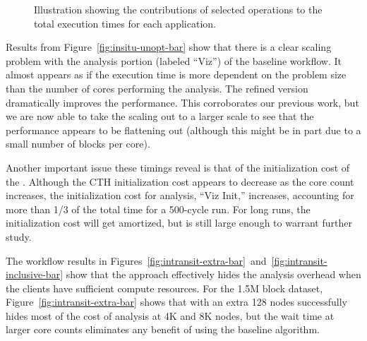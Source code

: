\begin{figure}[htbp]
\begin{centering}
\vspace{-24pt}

\caption[Breakdown of operation timings.]{Illustration showing the
contributions of selected operations to the total execution times for each
application.}
\label{fig:runtime-individual-bar}
\end{centering}
\end{figure}


Results from Figure~\ref{fig:insitu-unopt-bar} show that there is a clear
scaling problem with the analysis portion (labeled ``Viz'') of the baseline
\insitu workflow.  It almost appears as if the execution time is more
dependent on the problem size than the number of cores performing the analysis.
The refined version dramatically improves the performance.  This
corroborates our previous work, but we are now able to
take the scaling out to a larger scale to see that the performance appears
to be flattening out (although this might be in part due to a small number
of blocks per core).

Another important issue these timings reveal is that of the initialization
cost of the \vda.  Although the CTH initialization cost appears to decrease
as the core count increases, the initialization cost for analysis, ``Viz
Init,'' increases, accounting for more than 1/3 of the total time for a
500-cycle run.  For long runs, the initialization cost will get amortized,
but is still large enough to warrant further study.

The \intransit workflow results in
Figures~\ref{fig:intransit-extra-bar}~and~\ref{fig:intransit-inclusive-bar}
show that the \intransit approach effectively hides the analysis overhead
when the clients have sufficient compute resources.  For the 1.5M block
dataset, Figure~\ref{fig:intransit-extra-bar} shows that \intransit with an
extra 128 nodes successfully hides most of the cost of analysis at 4K and 8K
nodes, but the wait time at larger core counts eliminates any benefit of
\intransit using the baseline algorithm.

